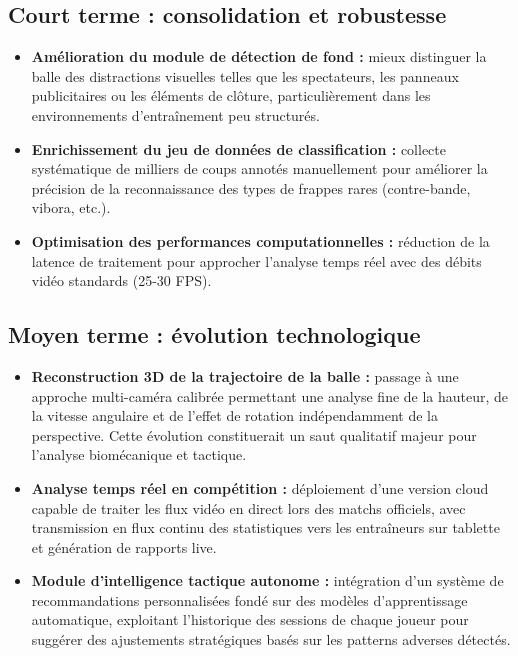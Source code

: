 \subsection*{Court terme : consolidation et robustesse}

\begin{itemize}
    \item \textbf{Amélioration du module de détection de fond :} mieux distinguer la balle des distractions visuelles telles que les spectateurs, les panneaux publicitaires ou les éléments de clôture, particulièrement dans les environnements d'entraînement peu structurés.
    \item \textbf{Enrichissement du jeu de données de classification :} collecte systématique de milliers de coups annotés manuellement pour améliorer la précision de la reconnaissance des types de frappes rares (contre-bande, vibora, etc.).
    \item \textbf{Optimisation des performances computationnelles :} réduction de la latence de traitement pour approcher l'analyse temps réel avec des débits vidéo standards (25-30 FPS).
\end{itemize}

\subsection*{Moyen terme : évolution technologique}

\begin{itemize}
    \item \textbf{Reconstruction 3D de la trajectoire de la balle :} passage à une approche multi-caméra calibrée permettant une analyse fine de la hauteur, de la vitesse angulaire et de l'effet de rotation indépendamment de la perspective. Cette évolution constituerait un saut qualitatif majeur pour l'analyse biomécanique et tactique.
    \item \textbf{Analyse temps réel en compétition :} déploiement d'une version cloud capable de traiter les flux vidéo en direct lors des matchs officiels, avec transmission en flux continu des statistiques vers les entraîneurs sur tablette et génération de rapports live.
    \item \textbf{Module d'intelligence tactique autonome :} intégration d'un système de recommandations personnalisées fondé sur des modèles d'apprentissage automatique, exploitant l'historique des sessions de chaque joueur pour suggérer des ajustements stratégiques basés sur les patterns adverses détectés.
\end{itemize}

